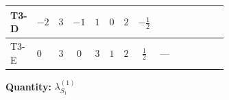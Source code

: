 \documentclass[8pt]{article}
\begin{document}
\begin{landscape}
\begin{longtable}{@{}llcccccc >{\raggedright\arraybackslash}p{0.21\linewidth} >{\raggedright\arraybackslash}p{0.21\linewidth} >{\raggedright\arraybackslash}p{0.21\linewidth}@{}}
T3-D & $-2$ & $3$ & $-1$ & $1$ & $0$ & $2$ & $-\frac{1}{2}$ & \scriptsize\adjustbox{max width=\linewidth}{$\begin{gathered} +12 {g_1}^4\end{gathered}$} & \scriptsize\adjustbox{max width=\linewidth}{$\begin{gathered} +\frac{3 {\lambda_{HS_1}^{(A)}}^2}{2}\end{gathered}$} & \scriptsize\adjustbox{max width=\linewidth}{$\begin{gathered} +14 {\lambda_{S_1}^{(1)}} {\lambda_{S_1}^{(A)}}\end{gathered}$} \\
\midrule
T3-E & $0$ & $3$ & $0$ & $3$ & $1$ & $2$ & $\frac{1}{2}$ & --- & \scriptsize\adjustbox{max width=\linewidth}{$\begin{gathered} +\frac{3 {\lambda_{HS_1}^{(A)}}^2}{2}\end{gathered}$} & \scriptsize\adjustbox{max width=\linewidth}{$\begin{gathered} +14 {\lambda_{S_1}^{(1)}} {\lambda_{S_1}^{(A)}}\end{gathered}$} \\
\midrule
\bottomrule
\end{longtable}
\clearpage
\noindent\textbf{Quantity: }$\lambda_{S_1}^{(1)}$\par\smallskip

\end{landscape}
\end{document}
